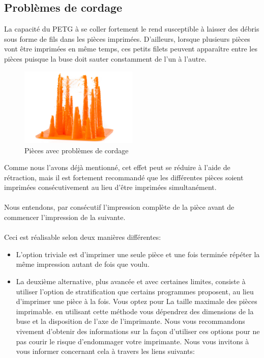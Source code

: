 \documentclass[11pt,a4paper]{article}
\begin{document}
	\subsection{Problèmes de cordage}La capacité du PETG à se coller fortement le rend susceptible à laisser des débris sous forme de fils dans les pièces imprimées. D’ailleurs, lorsque plusieurs pièces vont être imprimées en même temps, ces petits filets peuvent apparaître entre les pièces puisque la buse doit sauter constamment de l'un à l'autre.
\begin{figure}[H]
\centering
\includegraphics[width=0.5\textwidth,cfbox=azul_marcos 1pt 0pt]{FOTOS/RETRACCION1}
\caption*{Pièces avec problèmes de cordage}
\end{figure}
Comme nous l'avons déjà mentionné, cet effet peut se réduire à l’aide de rétraction, mais il est fortement recommandé que les différentes pièces soient imprimées consécutivement au lieu d’être imprimées simultanément.
\\\\
Nous entendons, par consécutif l’impression complète de la pièce avant de commencer l’impression de la suivante.
\\\\
Ceci est réalisable selon deux manières différentes:
\begin{itemize}
\item L'option triviale est d'imprimer une seule pièce et une fois terminée répéter la même impression autant de fois que voulu.
\item La deuxième alternative, plus avancée et avec certaines limites, consiste à utiliser l'option de stratification que certains programmes proposent, au lieu d'imprimer une pièce à la fois. Vous optez pour La taille maximale des pièces imprimable. en utilisant cette méthode vous dépendrez des dimensions de la buse et la disposition de l'axe de l'imprimante. Nous vous recommandons vivement d'obtenir des informations sur la façon d’utiliser ces options pour ne pas courir le risque d’endommager votre imprimante. Nous vous invitons à vous informer concernant cela à travers les liens suivants:
\end{itemize}
\end{document}
